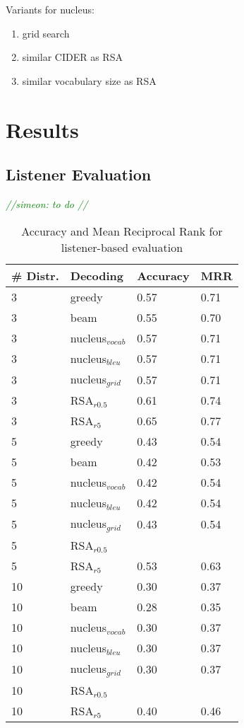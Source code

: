 \documentclass[11pt,a4paper]{article}
\newcommand{\simeon}[1]{\textcolor{green}{\emph{//simeon: #1//}}}
\begin{document}
Variants for nucleus:
\begin{enumerate}
    \item grid search 
    \item similar CIDER as RSA
    \item similar vocabulary size as RSA
\end{enumerate}

\section{Results}

\subsection{Listener Evaluation}


\simeon{to do }
\begin{table}
\small
\centering
\begin{tabular}{l|l|l|l }
    \toprule
    \# Distr. & Decoding & Accuracy & MRR  \\
     \midrule
    3 & greedy &  0.57 &  0.71 \\
    3 & beam &  0.55 &  0.70 \\
    3 & nucleus$_{vocab}$   &  0.57 &  0.71 \\
    3 & nucleus$_{bleu}$   &  0.57 &  0.71 \\
     3 & nucleus$_{grid}$   &  0.57 &  0.71 \\
    3 & RSA$_{r0.5}$ & 0.61 &  0.74 \\
    3 & RSA$_{r5}$ &  0.65 &  0.77 \\ 
    \midrule
    5 & greedy &  0.43 &  0.54 \\
    5 & beam &  0.42 &  0.53 \\
     5 & nucleus$_{vocab}$   &  0.42 &  0.54 \\
    5 & nucleus$_{bleu}$   &  0.42 &  0.54 \\
     5 & nucleus$_{grid}$   &  0.43 &  0.54 \\
    5 & RSA$_{r0.5}$ &\\
    5 & RSA$_{r5}$ &  0.53 &  0.63 \\
    \midrule
    10 & greedy &  0.30 &  0.37 \\
  10 & beam &  0.28 &  0.35 \\
   10 & nucleus$_{vocab}$   &  0.30 &  0.37 \\
    10 & nucleus$_{bleu}$   &  0.30 &  0.37 \\
     10 & nucleus$_{grid}$   &  0.30 &  0.37 \\
    10 & RSA$_{r0.5}$ &\\
    10 & RSA$_{r5}$ &  0.40 &  0.46 \\
    \bottomrule
\end{tabular}
\caption{Accuracy and Mean Reciprocal Rank for listener-based evaluation}
\end{table}
\end{document}
